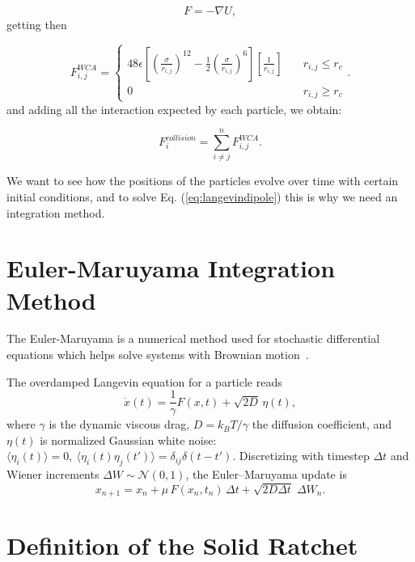 \begin{equation}
 F = - \nabla U, 
  \label{eq:negativegradient}
\end{equation}
getting then

\begin{equation}
  F_{i,j}^{WCA} = \begin{cases} 
    48\epsilon\left[ \left( \frac{\sigma}{r_{i,j}}\right)^{12} - \frac{1}{2}\left( \frac{\sigma}{r_{i,j}}\right)^6\right]\left[ \frac{1}{r_{i,j}}\right] \quad &r_{i,j} \leq r_c \\
    0 \quad & r_{i,j} \geq r_c
  \end{cases}.
  \label{eq:wcaforce}
\end{equation}
and adding all the interaction expected by each particle, we obtain:

\begin{equation}
  F^{collision}_i = \sum^{n}_{i \neq j} F^{WCA}_{i,j}.  
  \label{eq:wcasum}
\end{equation}

We want to see how the positions of the particles evolve over time with certain initial conditions, and to solve Eq. (\ref{eq:langevindipole}) this is why we need an integration method.

\section{Euler-Maruyama Integration Method}
The Euler-Maruyama is a numerical method used for stochastic differential equations which helps solve systems with Brownian motion~\cite{platen2010numerical,higham2001algorithmic}.

The overdamped Langevin equation for a particle reads
\[
  \dot{x}(t)= \frac{1}{\gamma} F(x,t)+\sqrt{2D}\,\eta(t),
\]
where $\gamma$ is the dynamic viscous drag, \(D=k_BT/\gamma\) the diffusion coefficient,
and \(\eta(t)\) is normalized Gaussian white noise:
\(\langle\eta_i(t)\rangle=0,\ \langle\eta_i(t)\eta_j(t')\rangle=\delta_{ij}\delta(t-t')\).
Discretizing with timestep \(\Delta t\) and Wiener increments \(\Delta W\sim\mathcal N(0, 1)\),
the Euler--Maruyama update is
\begin{equation}
x_{n+1} =  x_n + \mu\, F( x_n,t_n)\,\Delta t
  + \sqrt{2D \Delta t}\;\Delta W_n.
\label{eq:em_overdamped}
\end{equation}
\section{Definition of the Solid Ratchet}

